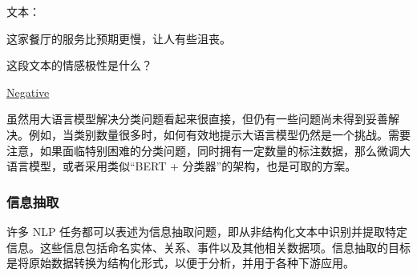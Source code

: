 \vspace{0.5em}
\begin{tcolorbox}

\begingroup
\setlength{\leftskip}{2em}
\setlength{\rightskip}{2em}


\vspace{0.5em}


\vspace{0.3em}


\vspace{0.3em}


\vspace{0.7em}

文本：

这家餐厅的服务比预期更慢，让人有些沮丧。

\vspace{0.7em}

这段文本的情感极性是什么？

\vspace{0.7em}

\underline{Negative}

\endgroup

\end{tcolorbox}
\vspace{0.5em}

虽然用大语言模型解决分类问题看起来很直接，但仍有一些问题尚未得到妥善解决。例如，当类别数量很多时，如何有效地提示大语言模型仍然是一个挑战。需要注意，如果面临特别困难的分类问题，同时拥有一定数量的标注数据，那么微调大语言模型，或者采用类似“BERT + 分类器”的架构，也是可取的方案。

\subsubsection{信息抽取}

\noindent 许多 NLP 任务都可以表述为信息抽取问题，即从非结构化文本中识别并提取特定信息。这些信息包括命名实体、关系、事件以及其他相关数据项。信息抽取的目标是将原始数据转换为结构化形式，以便于分析，并用于各种下游应用。

